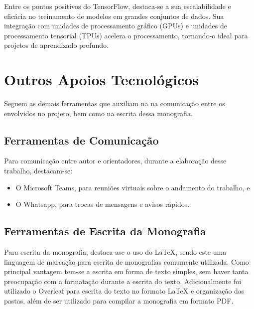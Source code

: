 Entre os pontos positivos do TensorFlow, destaca-se a sua escalabilidade e eficácia no treinamento de modelos em grandes conjuntos de dados. Sua integração com unidades de processamento gráfico (GPUs) e unidades de processamento tensorial (TPUs) acelera o processamento, tornando-o ideal para projetos de aprendizado profundo.

\section{Outros Apoios Tecnológicos}
\label{sec:demais}

Seguem as demais ferramentas que auxiliam na na comunicação entre os envolvidos no projeto, bem como na escrita dessa monografia.

\subsection{Ferramentas de Comunicação}

Para comunicação entre autor e orientadores, durante a elaboração desse trabalho, destacam-se: 

\begin{itemize}
	\item O Microsoft Teams, para reuniões virtuais sobre o andamento do trabalho, e 
	\item O Whatsapp, para trocas de mensagens e avisos rápidos.
\end{itemize}

\subsection{Ferramentas de Escrita da Monografia}

Para escrita da monografia, destaca-ase o uso do LaTeX, sendo este uma linguagem de marcação para escrita de monografias comumente utilizada. Como principal vantagem tem-se a escrita 
em forma de texto simples, sem haver tanta preocupação com a formatação durante a escrita do texto. Adicionalmente foi utilizado o Overleaf para escrita do texto no formato LaTeX 
e organização das pastas, além de ser utilizado para compilar a monografia em formato PDF.